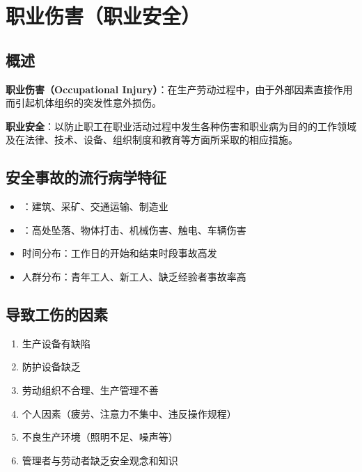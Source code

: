\chapter{职业伤害（职业安全）}
\setcounter{chapter}{9}

\section{概述}

\begin{defbox}
\textbf{职业伤害（Occupational Injury）}：在生产劳动过程中，由于外部因素直接作用而引起机体组织的突发性意外损伤。

\textbf{职业安全}：以防止职工在职业活动过程中发生各种伤害和职业病为目的的工作领域及在法律、技术、设备、组织制度和教育等方面所采取的相应措施。
\end{defbox}

\section{安全事故的流行病学特征}

\begin{itemize}[leftmargin=*]
    \item {}：建筑、采矿、交通运输、制造业
    \item {}：高处坠落、物体打击、机械伤害、触电、车辆伤害
    \item 时间分布：工作日的开始和结束时段事故高发
    \item 人群分布：青年工人、新工人、缺乏经验者事故率高
\end{itemize}

\section{导致工伤的因素}

\begin{enumerate}[leftmargin=*]
    \item 生产设备有缺陷
    \item 防护设备缺乏
    \item 劳动组织不合理、生产管理不善
    \item 个人因素（疲劳、注意力不集中、违反操作规程）
    \item 不良生产环境（照明不足、噪声等）
    \item 管理者与劳动者缺乏安全观念和知识
\end{enumerate}

